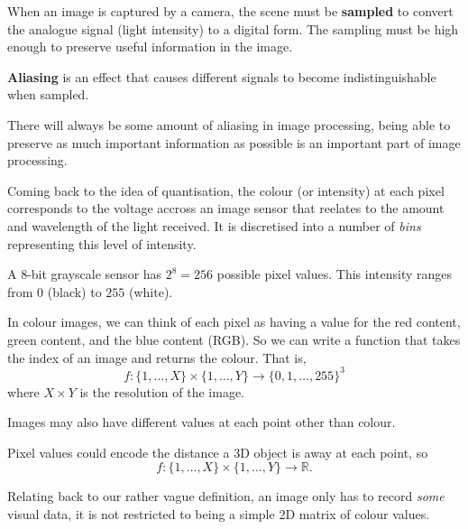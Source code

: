 When an image is captured by a camera, the scene must be \textbf{sampled} to convert the analogue signal (light intensity) to a digital form. The sampling must be high enough to preserve useful information in the image.

\begin{definition}[Aliasing]
   \textbf{Aliasing} is an effect that causes different signals to become indistinguishable when sampled. 
\end{definition}

There will always be some amount of aliasing in image processing, being able to preserve as much important information as possible is an important part of image processing. 

Coming back to the idea of quantisation, the colour (or intensity) at each pixel corresponds to the voltage accross an image sensor that reelates to the amount and wavelength of the light received. It is discretised into a number of \emph{bins} representing this level of intensity.

\begin{example}
    A $8$-bit grayscale sensor has $2^8 = 256$ possible pixel values. This intensity ranges from $0$ (black) to $255$ (white).
\end{example}

\begin{example}
    In colour images, we can think of each pixel as having a value for the red content, green content, and the blue content (RGB). So we can write a function that takes the index of an image and returns the colour. That is, \[ f: \{ 1, \ldots, X \} \times \{ 1, \ldots , Y \} \to \{ 0, 1, \ldots, 255 \}^3 \] where $X \times Y$ is the resolution of the image.
\end{example}

Images may also have different values at each point other than colour.

\begin{example}
    Pixel values could encode the distance a 3D object is away at each point, so \[ f: \{1, \ldots, X\} \times \{1, \ldots, Y\} \to \mathbb R.\]
\end{example}

\begin{remark}
    Relating back to our rather vague definition, an image only has to record \emph{some} visual data, it is not restricted to being a simple 2D matrix of colour values.
\end{remark}
